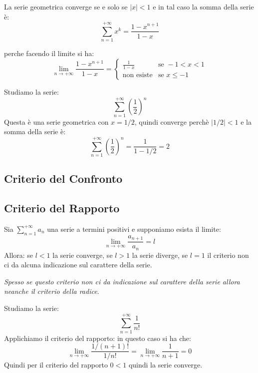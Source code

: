     La serie geometrica converge se e solo se $|x| < 1$ e in tal caso la somma della serie è:
    \[ \sum_{n=1}^{+\infty} x^k = \frac{1-x^{n+1}}{1-x} \]

    perche facendo il limite si ha:
    \begin{equation}
                \lim_{n \to +\infty} \frac {1-x^{n+1}} {1-x} = \begin{cases}
                    \frac{1}{1-x} & \text{se } -1 < x < 1 \\
                    \text{non esiste} & \text{se } x \leq -1
                \end{cases}
    \end{equation}
    \begin{esempio}
        Studiamo la serie:
            \[ \sum_{n=1}^{+\infty} \left( \frac{1}{2} \right)^n \]
        Questa è una serie geometrica con $x = 1/2$, quindi converge perchè $|1/2| < 1$ e la somma della serie è:
        \[ \sum_{n=1}^{+\infty} \left( \frac{1}{2} \right)^n = \frac{1}{1-1/2} = 2 \]
    \end{esempio}
    \subsection{Criterio del Confronto}





        \subsection{Criterio del Rapporto}
             \begin{definizione}
                    Sia \emph{$\sum_{n=1}^{+\infty}a_n$} una serie a termini positivi e supponiamo esista il limite:
                    \[ \lim_{n \to +\infty} \frac{a_{n+1}}{a_n} = l \]
                    Allora: se $l < 1$ la serie converge, se $l > 1$ la serie diverge, se $l = 1$ il criterio non ci da alcuna indicazione sul carattere della serie.
            \end{definizione}
                    \emph{Spesso se questo criterio non ci da indicazione sul carattere della serie allora neanche il criterio della radice}.
        \begin{esempio}
            Studiamo la serie:
                \[ \sum_{n=1}^{+\infty} \frac{1}{n!} \]
            Applichiamo il criterio del rapporto:
            in questo caso si ha che:
            \begin{equation} \lim_{n \to +\infty} \frac{1/(n+1)!}{1/n!} = \lim_{n \to +\infty} \frac{1}{n+1} = 0
            \end{equation}
            Quindi per il criterio del rapporto $0<1$ quindi la serie converge.
        \end{esempio}
